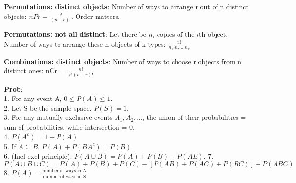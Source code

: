 \documentclass[a4paper,landscape]{article}
\newcommand{\rnname}[1]{\textbf{#1}}
\begin{document}
\begin{multicols*}{4}
\begin{flatitemize}
\item \rnname{Permutations: distinct objects}: Number of ways to arrange r out of n distinct objects: $nPr = \frac{n!}{(n-r)!}$. Order matters.
\item \rnname{Permutations: not all distinct}:
Let there be $n_i$ copies of the $i$th object. Number of ways to arrange these n objects of k types: $\frac{n!}{n_1!n_2!...n_k}$
\item \rnname{Combinations: distinct objects}: Number of ways to choose r objects from n distinct ones: nCr $ = \frac{n!}{r!(n-r)!}$  
\item \rnname{Prob}: \\
1. For any event A, $0 \leq P(A) \leq 1$.\\
2. Let S be the sample space. $P(S) = 1$.\\
3. For any mutually exclusive events $A_1, A_2, ...$, the union of their probabilities = sum of probabilities, while intersection = 0.\\
4. $P(A^c) = 1 - P(A)$\\
5. If $A \subseteq B$, $P(A) + P(BA^c) = P(B)$\\
6. (Incl-excl principle): $P(A \cup B) = P(A) + P(B) - P(AB)$.
7. $P(A \cup B \cup C) = P(A) + P(B) + P(C) - [P(AB) + P(AC) + P(BC)] + P(ABC)$
8. $P(A) = \frac{\text{number of ways in A}}{\text{number of ways in S}}$


\end{flatitemize}
\end{multicols*}
\end{document}
